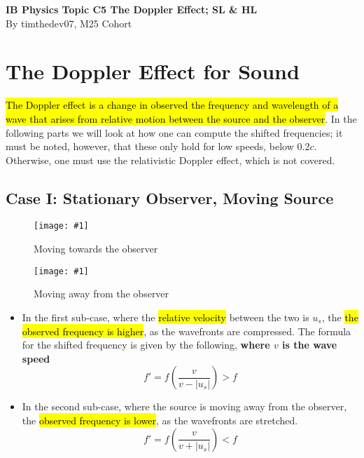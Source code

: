 \documentclass[a4paper,12pt]{article}
\let\oldsection\section
\renewcommand\section{\clearpage\oldsection}
\newcommand{\img}[4]{\begin{center}
  \begin{figure}[H]
    \centering
    \texttt{[image: \#1]}
    \caption{#3}
    \label{fig:#4}
  \end{figure}
\end{center}}
\newcommand{\paren}[1]{\left(#1\right)}
\begin{document}
\pagestyle{fancy}


\begin{titlepage}
  \begin{center}

    \vspace*{8cm}
    \textbf{\Large {IB Physics Topic C5 The Doppler Effect; SL \& HL}} \\
    \vspace*{1cm}
    \large{By timthedev07, M25 Cohort}


  \end{center}
\end{titlepage}

\pagebreak
\tableofcontents
\pagebreak

\clearpage
\setcounter{page}{1}

\section{The Doppler Effect for Sound}
\hl{The Doppler effect is a change in observed the frequency and wavelength of a wave that arises from relative motion between the source and the observer}. In the following parts we will look at how one can compute the shifted frequencies; it must be noted, however, that these only hold for low speeds, below $0.2c$. Otherwise, one must use the relativistic Doppler effect, which is not covered.


\subsection{Case I: Stationary Observer, Moving Source}

\begin{minipage}{0.45\textwidth}
  \img{1A.png}{1}{Moving towards the observer}{1A}
\end{minipage}\hspace*{0.1\textwidth}%
\begin{minipage}{0.45\textwidth}
  \img{1B.png}{1}{Moving away from the observer}{1B}
\end{minipage}

\begin{itemize}
  \item In the first sub-case, where the \hl{relative velocity} between the two is $u_s$, the \hl{the observed frequency is higher}, as the wavefronts are compressed. The formula for the shifted frequency is given by the following, \textbf{where $v$ is the wave speed}
        \begin{equation}
          f' = f\paren{\frac{v}{v - |u_s|}} > f
        \end{equation}
  \item In the second sub-case, where the source is moving away from the observer, the \hl{observed frequency is lower}, as the wavefronts are stretched.
        \begin{equation}
          f' = f\paren{\frac{v}{v + |u_s|}} < f
        \end{equation}
\end{itemize}
\end{document}
